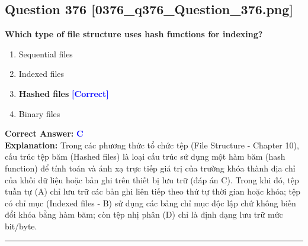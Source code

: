 \documentclass[11pt,a4paper]{article}
\begin{document}
\begin{minipage}{\textwidth}
\subsection*{Question 376 \quad \footnotesize{[0376\_q376\_Question\_376.png]}}
\noindent \textbf{Which type of file structure uses hash functions for indexing?}

\begin{enumerate}[label=\Alph*.]
    \item Sequential files
    \item Indexed files
    \item \textbf{Hashed files} \hfill \textcolor{blue}{\textbf{[Correct]}}
    \item Binary files
\end{enumerate}

\noindent \textbf{Correct Answer:} \textcolor{blue}{\textbf{C}} \\[2pt]
\noindent \textbf{Explanation:} Trong các phương thức tổ chức tệp (File Structure - Chapter 10), cấu trúc tệp băm (Hashed files) là loại cấu trúc sử dụng một hàm băm (hash function) để tính toán và ánh xạ trực tiếp giá trị của trường khóa thành địa chỉ của khối dữ liệu hoặc bản ghi trên thiết bị lưu trữ (đáp án C). Trong khi đó, tệp tuần tự (A) chỉ lưu trữ các bản ghi liên tiếp theo thứ tự thời gian hoặc khóa; tệp có chỉ mục (Indexed files - B) sử dụng các bảng chỉ mục độc lập chứ không biến đổi khóa bằng hàm băm; còn tệp nhị phân (D) chỉ là định dạng lưu trữ mức bit/byte.

\par\vspace{0.3cm}
\hrule
\vspace{0.3cm}
\end{minipage}
\end{document}
